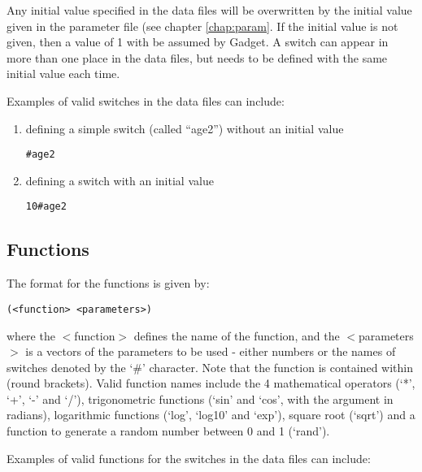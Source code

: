 \documentclass[]{book}
\begin{document}
Any initial value specified in the data files will be overwritten by the
initial value given in the parameter file (see
chapter \ref{chap:param}.
If the initial value is not given, then a value of 1 with be assumed by
Gadget. A switch can appear in more than one place in the data files,
but needs to be defined with the same initial value each time.

Examples of valid switches in the data files can include:

\begin{enumerate}
\def\labelenumi{\arabic{enumi}.}
\item
  defining a simple switch (called ``age2'') without an initial value

\begin{verbatim}
#age2
\end{verbatim}
\item
  defining a switch with an initial value

\begin{verbatim}
10#age2
\end{verbatim}
\end{enumerate}

\hypertarget{functions}{%
\subsection{Functions}\label{functions}}

The format for the functions is given by:

\begin{verbatim}
(<function> <parameters>)
\end{verbatim}

where the \(<\)function\(>\) defines the name of the function, and the
\(<\)parameters\(>\) is a vectors of the parameters to be used - either
numbers or the names of switches denoted by the `\#' character. Note
that the function is contained within (round brackets). Valid function
names include the 4 mathematical operators (`*', `+', `-' and `/'),
trigonometric functions (`sin' and `cos', with the argument in radians),
logarithmic functions (`log', `log10' and `exp'), square root (`sqrt')
and a function to generate a random number between 0 and 1 (`rand').

Examples of valid functions for the switches in the data files can
include:
\end{document}
